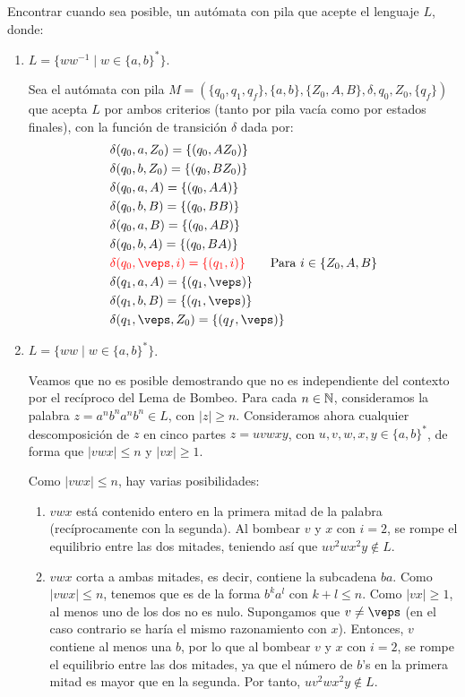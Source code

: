 \begin{ejercicio}\label{ej:1.6.2}
    Encontrar cuando sea posible, un autómata con pila que acepte el lenguaje $L$, donde:
    \begin{enumerate}
        \item \label{ej:1.6.2-1}
        $L = \{ww^{-1}\mid w\in {\{a,b\}}^{\ast}\}$.
        
        Sea el autómata con pila $M = (\{q_0,q_1,q_f\},\{a,b\},\{Z_0,A,B\},\delta,q_0,Z_0,\{q_f\})$ que acepta $L$ por ambos criterios (tanto por pila vacía como por estados finales), con la función de transición $\delta$ dada por:
        \begin{align*}
            &\delta(q_0,a,Z_0) = \{(q_0,AZ_0)\} \\
            &\delta(q_0,b,Z_0) = \{(q_0,BZ_0)\} \\
            &\delta(q_0,a,A) = \{(q_0,AA)\} \\
            &\delta(q_0,b,B) = \{(q_0,BB)\} \\
            &\delta(q_0,a,B) = \{(q_0,AB)\} \\
            &\delta(q_0,b,A) = \{(q_0,BA)\} \\
            &\red{\delta(q_0,\veps,i) = \{(q_1,i)\}} \qquad \text{Para } i\in \{Z_0,A,B\} \\
            &\delta(q_1,a,A) = \{(q_1,\veps)\} \\
            &\delta(q_1,b,B) = \{(q_1,\veps)\} \\
            &\delta(q_1,\veps,Z_0) = \{(q_f,\veps)\}
        \end{align*}
        \item $L = \{ww\mid w \in {\{a,b\}}^{\ast}\}$.
        
        Veamos que no es posible demostrando que no es independiente del contexto por el recíproco del Lema de Bombeo. Para cada $n\in \mathbb{N}$, consideramos la palabra $z=a^nb^na^nb^n\in L$, con $|z|\geq n$. Consideramos ahora cualquier descomposición de $z$ en cinco partes $z=uvwxy$, con $u,v,w,x,y\in {\{a,b\}}^{\ast}$, de forma que $|vwx|\leq n$ y $|vx|\geq 1$.

        Como $|vwx|\leq n$, hay varias posibilidades:
        \begin{enumerate}
            \item $vwx$ está contenido entero en la primera mitad de la palabra (recíprocamente con la segunda). Al bombear $v$ y $x$ con $i=2$, se rompe el equilibrio entre las dos mitades, teniendo así que $uv^2wx^2y\notin L$.
            \item $vwx$ corta a ambas mitades, es decir, contiene la subcadena $ba$. Como $|vwx|\leq n$, tenemos que es de la forma $b^k a^l$ con $k+l\leq n$. Como $|vx|\geq 1$, al menos uno de los dos no es nulo. Supongamos que $v\neq \veps$ (en el caso contrario se haría el mismo razonamiento con $x$). Entonces, $v$ contiene al menos una $b$, por lo que al bombear $v$ y $x$ con $i=2$, se rompe el equilibrio entre las dos mitades, ya que el número de $b$'s en la primera mitad es mayor que en la segunda. Por tanto, $uv^2wx^2y\notin L$.
        \end{enumerate}


\end{enumerate}
\end{ejercicio}
